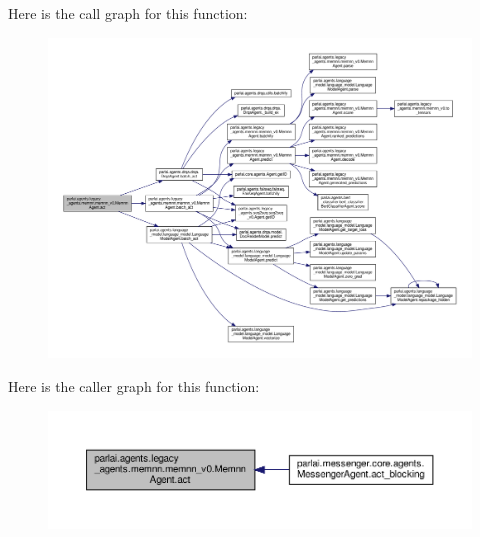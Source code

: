 Here is the call graph for this function\+:
\nopagebreak
\begin{figure}[H]
\begin{center}
\leavevmode
\includegraphics[width=350pt]{classparlai_1_1agents_1_1legacy__agents_1_1memnn_1_1memnn__v0_1_1MemnnAgent_a7079216ce7367ba0ca3ac205daa516c4_cgraph}
\end{center}
\end{figure}
Here is the caller graph for this function\+:
\nopagebreak
\begin{figure}[H]
\begin{center}
\leavevmode
\includegraphics[width=350pt]{classparlai_1_1agents_1_1legacy__agents_1_1memnn_1_1memnn__v0_1_1MemnnAgent_a7079216ce7367ba0ca3ac205daa516c4_icgraph}
\end{center}
\end{figure}
\mbox{\label{classparlai_1_1agents_1_1legacy__agents_1_1memnn_1_1memnn__v0_1_1MemnnAgent_a3ca2bd7b5cbce5ebac978deeb2ce9e10}} 
